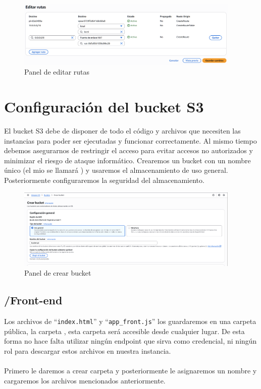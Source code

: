\documentclass{article}
\begin{document}
	
	\begin{figure}[H]
	\centering
	\includegraphics[width=0.95\textwidth]{editar_rutas.png}
	\caption{Panel de editar rutas}
	\end{figure}


	\section{Configuración del bucket S3}

	El bucket S3 debe de disponer de todo el código y archivos que necesiten las instancias para poder ser ejecutadas y funcionar correctamente. Al mismo tiempo debemos asegurarnos de restringir el acceso para evitar accesos no autorizados y minimizar el riesgo de ataque informático. Crearemos un bucket con un nombre único (el mio se llamará ) y usaremos el almacenamiento de uso general. Posteriormente configuraremos la seguridad del almacenamiento.

	
	\begin{figure}[H]
	\centering
	\includegraphics[width=0.95\textwidth]{crear_bucket.png}
	\caption{Panel de crear bucket}
	\end{figure}

	\subsection{/Front-end}

	Los archivos de ``\verb|index.html|'' y ``\verb|app_front.js|''  los guardaremos en una carpeta pública, la carpeta , esta carpeta será accesible desde cualquier lugar. De esta forma no hace falta utilizar ningún endpoint que sirva como credencial, ni ningún rol para descargar estos archivos en nuestra instancia.
	\\\\
	Primero le daremos a crear carpeta y posteriormente le asignaremos un nombre y cargaremos los archivos mencionados anteriormente.
\end{document}
